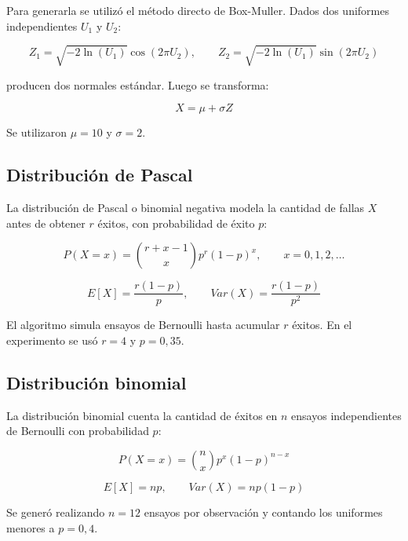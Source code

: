 \documentclass{article}
\begin{document}
Para generarla se utilizó el método directo de Box-Muller. Dados dos uniformes
independientes $U_1$ y $U_2$:

\begin{equation}
    Z_1=\sqrt{-2\ln(U_1)}\cos(2\pi U_2), \qquad
    Z_2=\sqrt{-2\ln(U_1)}\sin(2\pi U_2)
\end{equation}

\noindent producen dos normales estándar. Luego se transforma:

\begin{equation}
    X = \mu + \sigma Z
\end{equation}

Se utilizaron $\mu=10$ y $\sigma=2$.

\subsection{Distribución de Pascal}

La distribución de Pascal o binomial negativa modela la cantidad de fallas $X$
antes de obtener $r$ éxitos, con probabilidad de éxito $p$:

\begin{equation}
    P(X=x)=\binom{r+x-1}{x}p^r(1-p)^x,
    \qquad x=0,1,2,\ldots
\end{equation}

\begin{equation}
    E[X]=\frac{r(1-p)}{p}, \qquad
    Var(X)=\frac{r(1-p)}{p^2}
\end{equation}

El algoritmo simula ensayos de Bernoulli hasta acumular $r$ éxitos. En el
experimento se usó $r=4$ y $p=0{,}35$.

\subsection{Distribución binomial}

La distribución binomial cuenta la cantidad de éxitos en $n$ ensayos
independientes de Bernoulli con probabilidad $p$:

\begin{equation}
    P(X=x)=\binom{n}{x}p^x(1-p)^{n-x}
\end{equation}

\begin{equation}
    E[X]=np, \qquad Var(X)=np(1-p)
\end{equation}

Se generó realizando $n=12$ ensayos por observación y contando los uniformes
menores a $p=0{,}4$.
\end{document}
